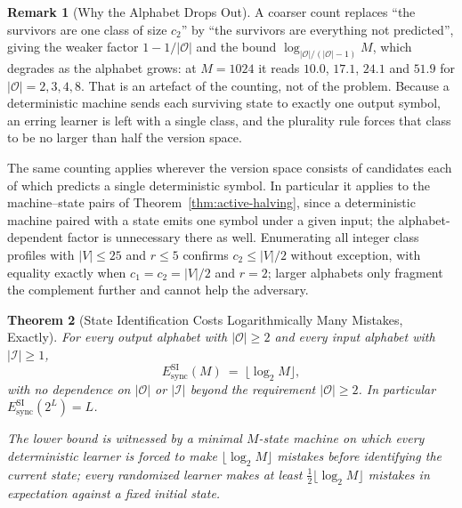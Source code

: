\documentclass[12pt]{article}
\newtheorem{theorem}{Theorem}[section]
\theoremstyle{definition}
\newtheorem{remark}[theorem]{Remark}
\newcommand{\EsyncSI}{E_{\mathrm{sync}}^{\mathrm{SI}}}
\begin{document}
\begin{remark}[Why the Alphabet Drops Out]
\label{rem:halving-alphabet-free}
A coarser count replaces ``the survivors are one class of size $c_2$'' by
``the survivors are everything not predicted'', giving the weaker factor
$1-1/|\mathcal O|$ and the bound
$\log_{|\mathcal O|/(|\mathcal O|-1)}M$, which degrades as the alphabet grows:
at $M=1024$ it reads $10.0$, $17.1$, $24.1$ and $51.9$ for
$|\mathcal O|=2,3,4,8$.  That is an artefact of the counting, not of the
problem.  Because a deterministic machine sends each surviving state to exactly
one output symbol, an erring learner is left with a single class, and the
plurality rule forces that class to be no larger than half the version space.

The same counting applies wherever the version space consists of candidates
each of which predicts a single deterministic symbol.  In particular it applies
to the machine--state pairs of Theorem~\ref{thm:active-halving}, since a
deterministic machine paired with a state emits one symbol under a given input;
the alphabet-dependent factor is unnecessary there as well.
Enumerating all integer class profiles with $|V|\le25$ and $r\le5$ confirms
$c_2\le|V|/2$ without exception, with equality exactly when $c_1=c_2=|V|/2$ and
$r=2$; larger alphabets only fragment the complement further and cannot help
the adversary.
\end{remark}

\begin{theorem}[State Identification Costs Logarithmically Many Mistakes, Exactly]
\label{thm:esyncsi-theta}
For every output alphabet with $|\mathcal O|\ge2$ and every input alphabet
with $|\mathcal I|\ge1$,
\[
\EsyncSI(M)\ =\ \bigl\lfloor\log_2M\bigr\rfloor ,
\]
with \emph{no} dependence on $|\mathcal O|$ or $|\mathcal I|$ beyond the
requirement $|\mathcal O|\ge2$.  In particular $\EsyncSI(2^L)=L$.

The lower bound is witnessed by a minimal $M$-state machine on which every
deterministic learner is forced to make $\lfloor\log_2M\rfloor$ mistakes before
identifying the current state; every randomized learner makes at least
$\tfrac12\lfloor\log_2M\rfloor$ mistakes in expectation against a fixed initial
state.
\end{theorem}
\end{document}
